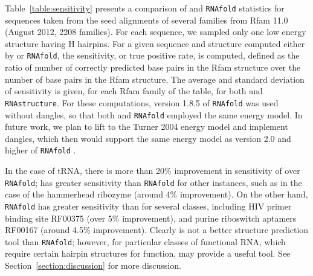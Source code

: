 Table~\ref{table:sensitivity} presents a comparison of {\rnahairpin}
and {\tt RNAfold} statistics for sequences taken from the seed alignments
of several families from Rfam 11.0 \citep{Burge.nar13}
(August 2012, 2208 families).  For each sequence,
we sampled only one low energy structure having H hairpins. For a given
sequence and structure computed either by {\rnahairpin} or {\tt RNAfold},
the sensitivity, or true positive rate, is computed, defined as
the ratio of number of correctly predicted base pairs in the
Rfam structure over the number of base pairs in the Rfam structure.
The average and standard deviation of sensitivity is given, for each
Rfam family of the table, for both {\rnahairpin} and {\tt RNAstructure}.
For these computations, version 1.8.5 of {\tt RNAfold} was used without
dangles, so that both {\rnahairpin} and {\tt RNAfold} employed the same
energy model. In future work, we plan to lift {\rnahairpin} to
the Turner 2004 energy model and implement dangles, which then would
support the same energy model as version 2.0 and higher of
{\tt RNAfold} \citep{Lorenz.amb11}.


In the case of tRNA, there is more than 20\% improvement in sensitivity
of {\rnahairpin} over {\tt RNAfold}; {\rnahairpin} has greater sensitivity
than {\tt RNAfold} for other instances, such as
in the case of the hammerhead ribozyme (around 4\% improvement).
On the other hand, {\tt RNAfold} has greater
sensitivity than {\rnahairpin} for several classes, including
HIV primer binding site RF00375 (over 5\% improvement), and
purine riboswitch aptamers RF00167 (around 4.5\% improvement).
Clearly {\rnahairpin} is not a better structure prediction tool than
{\tt RNAfold}; however, for particular classes of functional RNA,
which require certain hairpin structures for function, {\rnahairpin}
may provide a useful tool. See Section~\ref{section:discussion} for
more discussion.

